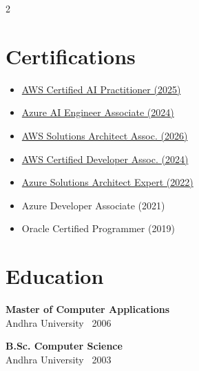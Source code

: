 \documentclass[10pt,a4paper]{article}
\begin{document}
\begin{paracol}{2}
\vspace{12pt} 
\section*{\faAward \hspace{4pt} Certifications}
\scriptsize
\begin{itemize}[leftmargin=3mm, itemsep=3pt]
    \item \href{https://www.credly.com/badges/5e894b23-c4f7-4a0a-8c51-111e6cda5d9f}{AWS Certified AI Practitioner (2025)}
    \item \href{https://learn.microsoft.com/api/credentials/share/en-us/MuraliChintala/F5FCFCA4028552C1}{Azure AI Engineer Associate (2024)}
    \item \href{https://www.credly.com/badges/781d466b-8d24-470d-8564-f7a7f7747c74}{AWS Solutions Architect Assoc. (2026)}
    \item \href{https://www.credly.com/badges/7752e98a-4907-47c0-83c5-e24dad34ec82}{AWS Certified Developer Assoc. (2024)}
    \item \href{https://learn.microsoft.com/en-us/users/muralichintala/credentials/6c7fae34bf5fe202}{Azure Solutions Architect Expert (2022)}
    \item Azure Developer Associate (2021)
    \item Oracle Certified Programmer (2019)
\end{itemize}

\vspace{12pt} 
\section*{\faGraduationCap \hspace{4pt} Education}
\footnotesize
\textbf{Master of Computer Applications} \\
{\scriptsize Andhra University \textbar\ 2006}

\vspace{6pt}
\textbf{B.Sc. Computer Science} \\
{\scriptsize Andhra University \textbar\ 2003}

\end{paracol}
\end{document}
